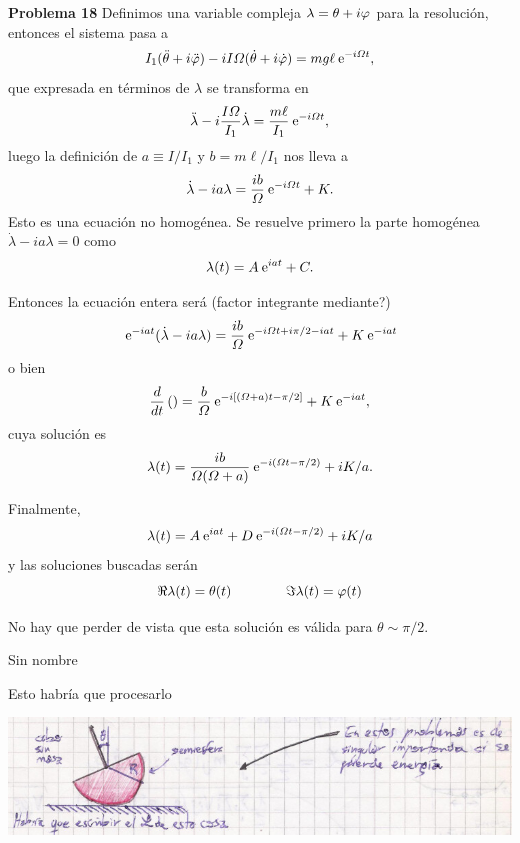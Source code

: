 \documentclass[10pt,oneside]{CBFT_book}
\begin{document}
\begin{ejemplo}{\bf Problema 18}
Definimos una variable compleja $\lambda = \theta + i \varphi $ para la resolución, entonces el sistema
pasa a 
\[
	I_1 (\ddot{\theta} + i \ddot{\varphi} ) - i I \Omega ( \dot{\theta} + i \dot{\varphi} ) = m g \ell \:\mathrm{e}^{ -i \Omega t },
\]
que expresada en términos de $\lambda$ se transforma en 
\[
	\ddot{\lambda} - i\frac{I \Omega}{I_1} \dot{\lambda} = \frac{m \ell}{I_1} \:\mathrm{e}^{-i \Omega t},
\]
luego la definición de $a \equiv I/I_1$ y $ b = m \ell / I_1 $ nos lleva a
\[
	\dot{\lambda} - i a \lambda = \frac{ib}{\Omega} \:\mathrm{e}^{-i \Omega t} + K.
\]
Esto es una ecuación no homogénea. Se resuelve primero la parte homogénea $\dot{\lambda} - ia\lambda = 0$
como 
\[
	\lambda(t) = A \:\mathrm{e}^{iat} + C.
\]

Entonces la ecuación entera será (factor integrante mediante?)
\[
	\:\mathrm{e}^{-i a t } ( \dot{\lambda} - i a \lambda ) = \frac{ib}{\Omega} \:\mathrm{e}^{-i \Omega t + i \pi/2 - i a t } + K \:\mathrm{e}^{ - i a t }
\]
o bien 
\[
	\frac{d^{\hspace{-0.05em}} {}}{d {t}^{\hspace{-0.05em}}}\left( \right) = \frac{b}{\Omega}  \:\mathrm{e}^{-i [ (\Omega + a ) t - \pi/2 ] } + K \:\mathrm{e}^{ - i a t },
\]
cuya solución es
\[
	\lambda( t ) = \frac{ib}{\Omega(\Omega+a)} \:\mathrm{e}^{-i(\Omega t - \pi/2)} + i K/a.
\]

Finalmente,
\[
	\lambda( t ) = A \:\mathrm{e}^{iat} + D \:\mathrm{e}^{-i(\Omega t - \pi/2)} + i K/a
\]
y las soluciones buscadas serán
\[
	\Re{\lambda(t)} = \theta(t) \qquad \qquad \Im{\lambda(t)} = \varphi(t)
\]

No hay que perder de vista que esta solución es válida para $\theta \sim \pi/2$.
\end{ejemplo}

\begin{ejemplo}{Sin nombre}

Esto habría que procesarlo

\includegraphics[scale=0.4]{images/fig_mc_case_trompo_deforme.jpg}

\end{ejemplo}


\end{document}
